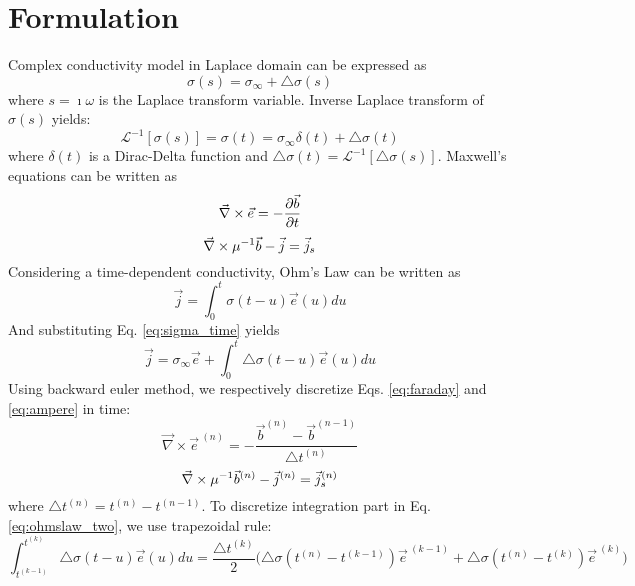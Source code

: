 \documentclass[extra,mreferee]{gji}
\newcommand{\curl}{{\vec \nabla}\times}
\newcommand{\siginf}{\sigma_\infty}
\newcommand{\dsig}{\triangle\sigma}
\renewcommand {\j}  { {\vec j} }
\renewcommand {\b}  { {\vec b} }
\newcommand {\e}  { {\vec e} }
\begin{document}
\section{Formulation}
Complex conductivity model in Laplace domain can be expressed as
\begin{equation}
  \sigma (s) = \siginf + \dsig (s)
\end{equation}
where $s=\imath \omega$ is the Laplace transform variable. Inverse Laplace transform of $\sigma(s)$ yields:
\begin{equation}
  \mathcal{L}^{-1}[\sigma(s)] = \sigma(t) = \siginf \delta (t) + \dsig (t)
  \label{eq:sigma_time}
\end{equation}
where  $\delta(t)$ is a Dirac-Delta function and $\dsig(t) = \mathcal{L}^{-1}[\dsig(s)]$.
Maxwell's equations can be written as
\begin{equation}
  \curl \e = -\frac{\partial \b}{\partial t} \\
  \label{eq:faraday}
\end{equation}
\begin{equation}
  \curl \mu^{-1} \b - \j = \j_s \\
  \label{eq:ampere}
\end{equation}
Considering a time-dependent conductivity, Ohm's Law can be written as
\begin{equation}
  \j = \int_0^t \sigma(t-u) \e (u) du
  \label{eq:ohmslaw}
\end{equation}
And substituting Eq. \ref{eq:sigma_time} yields
\begin{equation}
  \j = \siginf \e + \int_0^t \dsig(t-u) \e (u) du
  \label{eq:ohmslaw_two}
\end{equation}
Using backward euler method, we respectively discretize Eqs. \ref{eq:faraday} and \ref{eq:ampere} in time:
\begin{equation}
  \curl \e^{\ (n)} = -\frac{\b^{(n)}-\b^{(n-1)}}{\triangle t^{(n)}}
  \label{eq:faraday_time}
\end{equation}
\begin{equation}
  \curl \mu^{-1} \b^{(n)} - \j^{(n)} = \j_s^{(n)} \\
  \label{eq:ampere_time}
\end{equation}
where $\triangle t^{(n)} = t^{(n)}- t^{(n-1)}$.
To discretize integration part in Eq. \ref{eq:ohmslaw_two}, we use trapezoidal rule:
\begin{equation}
  \int_{t^{(k-1)}}^{t^{(k)}} \dsig(t-u) \e (u) du
  = \frac{\triangle t^{(k)}}{2} \Big(\dsig (t^{(n)} - t^{(k-1)}) \e^{\ (k-1)} + \dsig (t^{(n)} - t^{(k)}) \e^{\ (k)} \Big)
\end{equation}
\end{document}
